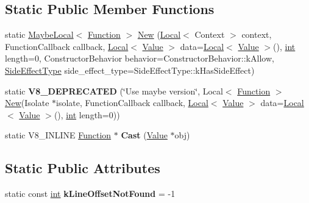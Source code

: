 \subsection*{Static Public Member Functions}
\begin{DoxyCompactItemize}
\item 
static \mbox{\hyperlink{classv8_1_1MaybeLocal}{Maybe\+Local}}$<$ \mbox{\hyperlink{classv8_1_1Function}{Function}} $>$ \mbox{\hyperlink{classv8_1_1Function_a6b5dd53724b97fd2c7da9ea9a772367d}{New}} (\mbox{\hyperlink{classv8_1_1Local}{Local}}$<$ Context $>$ context, Function\+Callback callback, \mbox{\hyperlink{classv8_1_1Local}{Local}}$<$ \mbox{\hyperlink{classv8_1_1Value}{Value}} $>$ data=\mbox{\hyperlink{classv8_1_1Local}{Local}}$<$ \mbox{\hyperlink{classv8_1_1Value}{Value}} $>$(), \mbox{\hyperlink{classint}{int}} length=0, Constructor\+Behavior behavior=Constructor\+Behavior\+::k\+Allow, \mbox{\hyperlink{namespacev8_a29711319c2b9fc7716d65faee2f7b9cb}{Side\+Effect\+Type}} side\+\_\+effect\+\_\+type=Side\+Effect\+Type\+::k\+Has\+Side\+Effect)
\item 
\mbox{\label{classv8_1_1Function_a4ffb43746def98eb33536fa05bfecf16}} 
static {\bfseries V8\+\_\+\+D\+E\+P\+R\+E\+C\+A\+T\+ED} (\char`\"{}Use maybe version\char`\"{}, Local$<$ \mbox{\hyperlink{classv8_1_1Function}{Function}} $>$ \mbox{\hyperlink{classv8_1_1Function_a6b5dd53724b97fd2c7da9ea9a772367d}{New}}(Isolate $\ast$isolate, Function\+Callback callback, \mbox{\hyperlink{classv8_1_1Local}{Local}}$<$ \mbox{\hyperlink{classv8_1_1Value}{Value}} $>$ data=\mbox{\hyperlink{classv8_1_1Local}{Local}}$<$ \mbox{\hyperlink{classv8_1_1Value}{Value}} $>$(), \mbox{\hyperlink{classint}{int}} length=0))
\item 
\mbox{\label{classv8_1_1Function_af24f38bcc0769519816cda1f6a154ff8}} 
static V8\+\_\+\+I\+N\+L\+I\+NE \mbox{\hyperlink{classv8_1_1Function}{Function}} $\ast$ {\bfseries Cast} (\mbox{\hyperlink{classv8_1_1Value}{Value}} $\ast$obj)
\end{DoxyCompactItemize}
\subsection*{Static Public Attributes}
\begin{DoxyCompactItemize}
\item 
\mbox{\label{classv8_1_1Function_acf0af24f79908e405a6ac435277596d9}} 
static const \mbox{\hyperlink{classint}{int}} {\bfseries k\+Line\+Offset\+Not\+Found} = -\/1
\end{DoxyCompactItemize}


